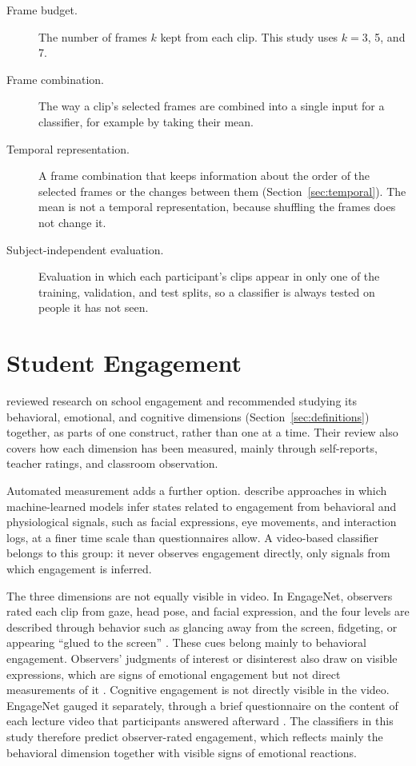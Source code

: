 \begin{description}
   \item[Frame budget.] The number of frames $k$ kept from each clip. This study uses $k = 3$, 5, and 7.

   \item[Frame combination.] The way a clip's selected frames are combined into a single input for a classifier, for example by taking their mean.

   \item[Temporal representation.] A frame combination that keeps information about the order of the selected frames or the changes between them (Section~\ref{sec:temporal}). The mean is not a temporal representation, because shuffling the frames does not change it.

   \item[Subject-independent evaluation.] Evaluation in which each participant's clips appear in only one of the training, validation, and test splits, so a classifier is always tested on people it has not seen.

\end{description}



\section{Student Engagement}
\label{sec:engagement}

 reviewed research on school engagement and recommended studying its behavioral, emotional, and cognitive dimensions (Section~\ref{sec:definitions}) together, as parts of one construct, rather than one at a time. Their review also covers how each dimension has been measured, mainly through self-reports, teacher ratings, and classroom observation.

Automated measurement adds a further option.  describe approaches in which machine-learned models infer states related to engagement from behavioral and physiological signals, such as facial expressions, eye movements, and interaction logs, at a finer time scale than questionnaires allow. A video-based classifier belongs to this group: it never observes engagement directly, only signals from which engagement is inferred.

The three dimensions are not equally visible in video. In EngageNet, observers rated each clip from gaze, head pose, and facial expression, and the four levels are described through behavior such as glancing away from the screen, fidgeting, or appearing ``glued to the screen'' \cite{singh2023}. These cues belong mainly to behavioral engagement. Observers' judgments of interest or disinterest also draw on visible expressions, which are signs of emotional engagement but not direct measurements of it \cite{barrett2019}. Cognitive engagement is not directly visible in the video. EngageNet gauged it separately, through a brief questionnaire on the content of each lecture video that participants answered afterward \cite{singh2023}. The classifiers in this study therefore predict observer-rated engagement, which reflects mainly the behavioral dimension together with visible signs of emotional reactions.



